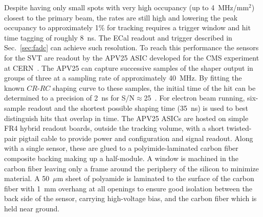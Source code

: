 \documentclass[final,3p,times,twocolumn]{elsarticle}
\begin{document}
Despite having only small spots with very high occupancy (up to 4~MHz/mm$^2$) closest to the primary 
beam, the rates are still high and lowering the peak occupancy to 
approximately 1\% for tracking requires a trigger window and hit time tagging of roughly 8~ns. The 
ECal readout and trigger described in Sec.~\ref{sec:fadc} can achieve such resolution. To reach this 
performance the sensors for the SVT are readout by the APV25 ASIC developed for the CMS 
experiment at CERN~\cite{French:2001xb}. The APV25 can capture successive samples of the shaper output 
in groups of three at a sampling rate of approximately 40~MHz.  By fitting the known 
$CR$-$RC$ shaping curve to these samples, the initial time of the hit can be determined to a precision 
of 2~ns for S/N$\approx$25~\cite{Friedl:2009zz}.  For electron beam running, six-sample readout and 
the shortest possible shaping time (35~ns) is used to best distinguish hits that overlap in time.
The APV25 ASICs are hosted on simple FR4 hybrid readout boards, outside the tracking volume, with a 
short twisted-pair pigtail cable to provide power and configuration and signal readout. Along with a 
single sensor, these are glued to a polyimide-laminated carbon fiber composite backing making 
up a half-module. A window is machined in the carbon fiber leaving only a frame around the periphery 
of the silicon to minimize material. A 50~$\mu$m sheet of polyamide is laminated to the surface of the 
carbon fiber with 1~mm overhang at all openings to ensure good isolation between the back side of the 
sensor, carrying high-voltage bias, and the carbon fiber which is held near ground. 
\end{document}
